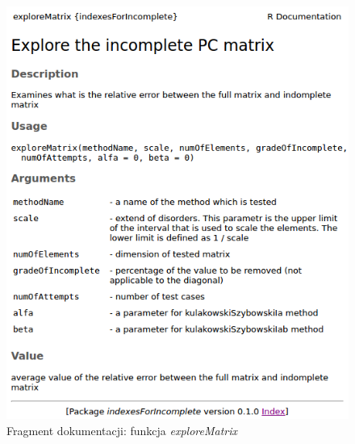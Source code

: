 \begin{figure}[!ht]
\centerline{\includegraphics[scale=0.58]{images/kod33.png}}
\caption{Fragment dokumentacji: funkcja \textit{exploreMatrix}}
\label{fig:rstudio}
\end{figure}